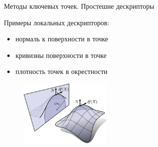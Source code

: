 \documentclass[6pt,pdf,utf8,russian]{beamer}
\begin{document}
\begin{frame}[fragile]{Методы ключевых точек. Простешие дескрипторы}
    \begin{block}{}
        Примеры локальных дескрипторов:
        \begin{itemize}
            \item нормаль к поверхности в точке
            \item кривизны поверхности в точке
            \item плотность точек в окрестности
        \end{itemize}
    \end{block}

    \pause

    \begin{block}{}
        \begin{figure}
            \includegraphics[width=0.4\textwidth]{images/simple_descriptor.jpg}
        \end{figure}
    \end{block}

\end{frame}
\end{document}
